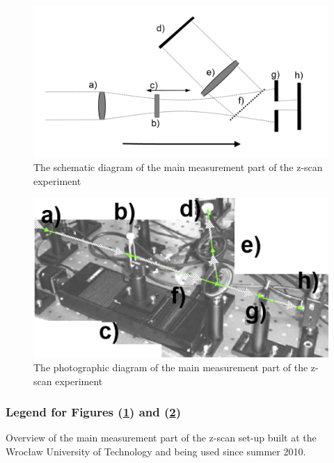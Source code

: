 \documentclass[12pt,twoside,a4paper]{article}
\numberwithin{equation}{subsection}
\numberwithin{figure}{subsection}
\begin{document}
\begin{figure}
 \includegraphics{img/zscan_sch.png}
 \caption{ The schematic diagram of the main measurement part of the z-scan experiment 
 \label{fig:zscan_sch}}
\end{figure}

\begin{figure}
 \includegraphics{img/zscan_diag.png}
 \caption{The photographic diagram of the main measurement part of the z-scan experiment 
 \label{fig:zscan_diag}}
\end{figure}

\subsubsection*{Legend for Figures (\ref{fig:zscan_sch}) and (\ref{fig:zscan_diag})} 

Overview of the main measurement part of the z-scan set-up built at the Wrocław University of Technology and being used since summer 2010.
 
\end{document}
